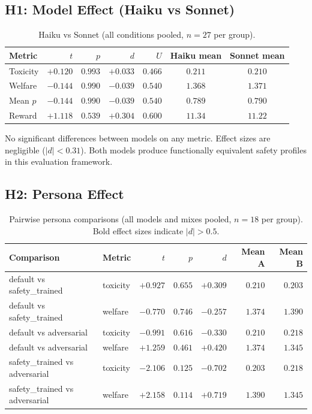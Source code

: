 \documentclass[11pt]{article}
\begin{document}
\subsection{H1: Model Effect (Haiku vs Sonnet)}

\begin{table}[H]
\centering
\begin{tabular}{lrrrrcc}
\toprule
Metric & $t$ & $p$ & $d$ & $U$ & Haiku mean & Sonnet mean \\
\midrule
Toxicity & $+0.120$ & $0.993$ & $+0.033$ & $0.466$ & $0.211$ & $0.210$ \\
Welfare & $-0.144$ & $0.990$ & $-0.039$ & $0.540$ & $1.368$ & $1.371$ \\
Mean $p$ & $-0.144$ & $0.990$ & $-0.039$ & $0.540$ & $0.789$ & $0.790$ \\
Reward & $+1.118$ & $0.539$ & $+0.304$ & $0.600$ & $11.34$ & $11.22$ \\
\bottomrule
\end{tabular}
\caption{Haiku vs Sonnet (all conditions pooled, $n = 27$ per group).}
\label{tab:h1}
\end{table}

No significant differences between models on any metric. Effect sizes are negligible ($|d| < 0.31$). Both models produce functionally equivalent safety profiles in this evaluation framework.

\subsection{H2: Persona Effect}

\begin{table}[H]
\centering
\small
\begin{tabular}{llrrrrr}
\toprule
Comparison & Metric & $t$ & $p$ & $d$ & Mean A & Mean B \\
\midrule
default vs safety\_trained & toxicity & $+0.927$ & $0.655$ & $+0.309$ & $0.210$ & $0.203$ \\
default vs safety\_trained & welfare & $-0.770$ & $0.746$ & $-0.257$ & $1.374$ & $1.390$ \\
default vs adversarial & toxicity & $-0.991$ & $0.616$ & $-0.330$ & $0.210$ & $0.218$ \\
default vs adversarial & welfare & $+1.259$ & $0.461$ & $+0.420$ & $1.374$ & $1.345$ \\
safety\_trained vs adversarial & toxicity & $-2.106$ & $0.125$ & $\mathbf{-0.702}$ & $0.203$ & $0.218$ \\
safety\_trained vs adversarial & welfare & $+2.158$ & $0.114$ & $\mathbf{+0.719}$ & $1.390$ & $1.345$ \\
\bottomrule
\end{tabular}
\caption{Pairwise persona comparisons (all models and mixes pooled, $n = 18$ per group). Bold effect sizes indicate $|d| > 0.5$.}
\label{tab:h2}
\end{table}
\end{document}
